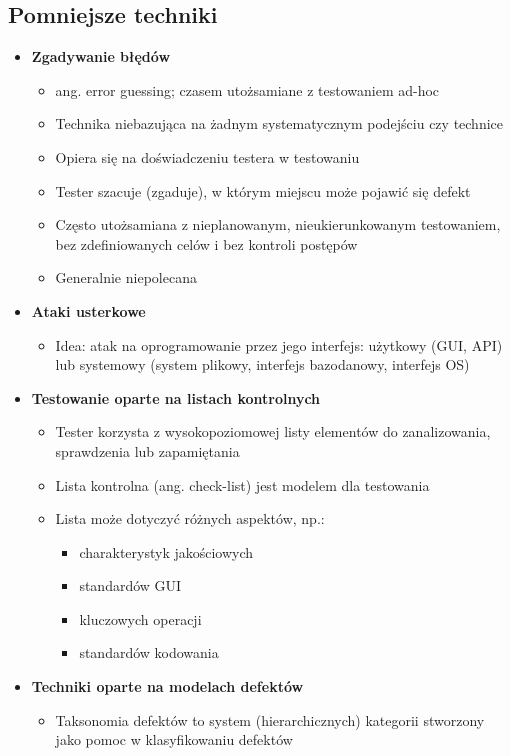 \documentclass[../main.tex]{subfiles}
\begin{document}
    \subsection{Pomniejsze techniki}
    \begin{itemize}
        \item \textbf{Zgadywanie błędów}
        \begin{itemize}
            \item ang. error guessing; czasem utożsamiane z testowaniem ad-hoc
            \item Technika niebazująca na żadnym systematycznym podejściu czy technice
            \item Opiera się na doświadczeniu testera w testowaniu
            \item Tester szacuje (zgaduje), w którym miejscu może pojawić się defekt
            \item Często utożsamiana z nieplanowanym, nieukierunkowanym testowaniem, bez zdefiniowanych celów i bez kontroli postępów
            \item Generalnie niepolecana
        \end{itemize}

        \item \textbf{Ataki usterkowe}
        \begin{itemize}
            \item Idea: atak na oprogramowanie przez jego interfejs: użytkowy (GUI, API)
            lub systemowy (system plikowy, interfejs bazodanowy, interfejs OS)
        \end{itemize}

        \item \textbf{Testowanie oparte na listach kontrolnych}
        \begin{itemize}
            \item Tester korzysta z wysokopoziomowej listy elementów do
            zanalizowania, sprawdzenia lub zapamiętania
            \item Lista kontrolna (ang. check-list) jest modelem dla testowania
            \item Lista może dotyczyć różnych aspektów, np.:
            \begin{itemize}
                \item charakterystyk jakościowych
                \item standardów GUI
                \item kluczowych operacji
                \item standardów kodowania
            \end{itemize}
        \end{itemize}

        \item \textbf{Techniki oparte na modelach defektów}
        \begin{itemize}
            \item{Taksonomia defektów} to system (hierarchicznych) kategorii
            stworzony jako pomoc w klasyfikowaniu defektów
        \end{itemize}
    \end{itemize}
\end{document}
